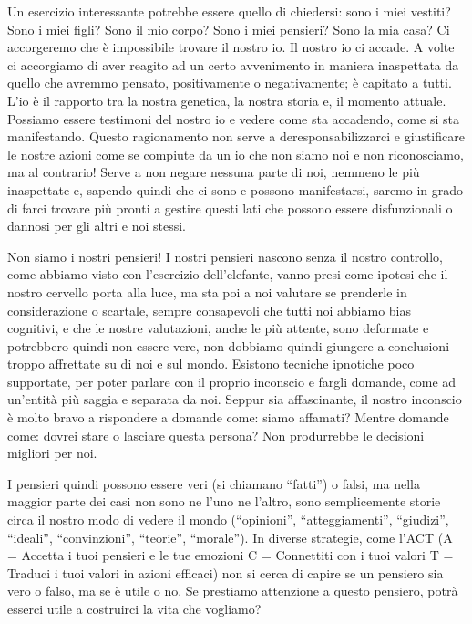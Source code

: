 \documentclass[12pt]{book} %
\begin{document}
Un esercizio interessante potrebbe essere quello di
chiedersi: sono i miei vestiti? Sono i miei figli? Sono il mio corpo? Sono i miei pensieri? Sono la mia casa? Ci
accorgeremo che è impossibile trovare il nostro io. Il nostro io ci accade. A volte ci accorgiamo di aver reagito ad un
certo avvenimento in maniera inaspettata da quello che avremmo pensato, positivamente o negativamente; è capitato a
tutti. L'io è il rapporto tra la nostra genetica, la nostra storia e, il momento attuale. Possiamo
essere testimoni del nostro io e vedere come sta accadendo, come si sta manifestando. Questo ragionamento non serve a
deresponsabilizzarci e giustificare le nostre azioni come se compiute da un io che non siamo noi e non riconosciamo, ma
al contrario! Serve a non negare nessuna parte di noi, nemmeno le più inaspettate e, sapendo quindi che ci sono e
possono manifestarsi, saremo in grado di farci trovare più pronti a gestire questi lati che possono essere
disfunzionali o dannosi per gli altri e noi stessi.

Non siamo i nostri pensieri! I nostri pensieri nascono senza il nostro controllo, come abbiamo visto con
l'esercizio dell'elefante, vanno presi come ipotesi che il nostro cervello
porta alla luce, ma sta poi a noi valutare se prenderle in considerazione o scartale, sempre consapevoli che tutti noi
abbiamo bias cognitivi, e che le nostre valutazioni, anche le più attente, sono deformate e potrebbero quindi non
essere vere, non dobbiamo quindi giungere a conclusioni troppo affrettate su di noi e sul mondo. Esistono tecniche
ipnotiche poco supportate, per poter parlare con il proprio inconscio e fargli domande, come ad un'entità più saggia e separata da noi.
Seppur sia affascinante, il nostro inconscio è molto bravo a rispondere a domande come: siamo affamati? Mentre domande
come: dovrei stare o lasciare questa persona? Non produrrebbe le decisioni migliori per noi. 

I pensieri quindi possono essere veri (si chiamano “fatti”) o falsi, ma nella maggior parte dei casi non sono ne
l'uno ne l'altro, sono semplicemente storie circa il nostro modo di vedere il
mondo (“opinioni”, “atteggiamenti”, “giudizi”, “ideali”, “convinzioni”, “teorie”, “morale”). In diverse strategie, come
l'ACT (A = Accetta i tuoi pensieri e le tue emozioni C = Connettiti con i tuoi valori T = Traduci
i tuoi valori in azioni efficaci) non si cerca di capire se un pensiero sia vero o falso, ma se è utile o no. Se
prestiamo attenzione a questo pensiero, potrà esserci utile a costruirci la vita che vogliamo?
\end{document}
